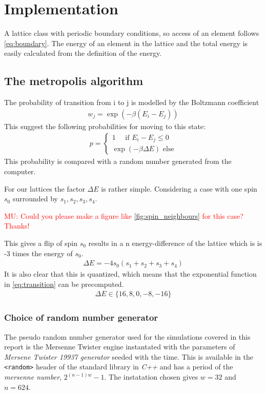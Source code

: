 \documentclass[11pt,a4paper,english]{article}
\numberwithin{equation}{section}
\begin{document}
\section{Implementation}

A lattice class with periodic boundary conditions, so access of an
element follows \eqref{eq:boundary}. The energy of an element in the 
lattice and the total energy is easily calculated from the definition
of the energy. 

\subsection{The metropolis algorithm}

The probability of transition from i to j 
is modelled by the Boltzmann coefficient
\begin{gather}
w_j = \exp(-\beta (E_i - E_j))
\end{gather}
This suggest the following probabilities for moving to this state:
\begin{gather}
p = \begin{cases}
1 \quad\text{ if }  E_i - E_j \le 0\\
\exp(-\beta \Delta E) \text{ else}
\end{cases}
\label{eq:transition}
\end{gather}
This probability is compared with a random number generated from 
the computer.

For our lattices the factor $\Delta E$ is rather simple. Considering 
a case with one spin $s_0$ surrounded by $s_1,s_2,s_3, s_4$. 

\textcolor{red}{MU: Could you please make a figure like \ref{fig:spin_neighbours}
for this case? Thanks!}

This gives a flip of spin $s_0$ results in a n
energy-difference of the lattice which is
is -3 times the energy of $s_0$.
\begin{gather}
\Delta E = -4s_0(s_1 + s_2 + s_3 + s_4)
\end{gather}
It is also clear that this is quantized, which means that the 
exponential function in \eqref{eq:transition} can be precomputed.
\begin{gather}
\Delta E \in \{16, 8, 0, -8, -16\}
\end{gather}




\subsubsection{Choice of random number generator}
The pseudo random number generator used for the simulations covered in 
this report is the Mersenne Twister engine
instantated with the parameters of 
\emph{Mersene Twister 19937 generator} seeded with the time.
This is available in the \texttt{<random>} header of the standard
library in \emph{C++} and has a period of the \emph{mersenne number}, $2^{(n-1)w}-1$.
The instatation chosen gives $w=32$ and $n=624$.	
\end{document}
